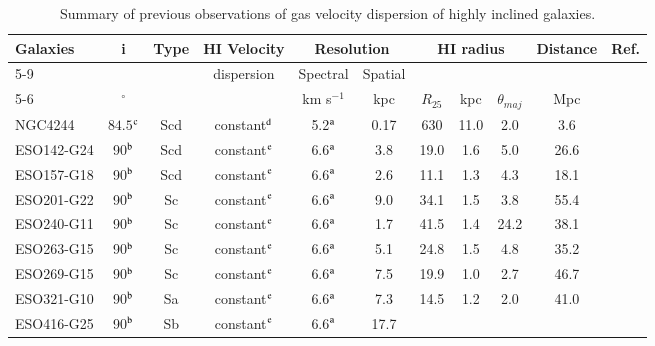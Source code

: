 \documentclass[traditabstract]{aa} %
\newcommand\kms{km s$^{-1}$}
\newcommand\dg{$^{\circ }$}
\begin{document}
\begin{table}[t] %
\caption[Summary of previous measurements of gas velocity 
dispersion in highly-inclined 
galaxies]{Summary of 
  previous observations of gas velocity dispersion of highly inclined galaxies.}
\label{tab:ch4-vel-disp-meas-highi}
\begin{footnotesize}
\begin{tabular}{lcccccccccc}
\hline
Galaxies & i & Type & H{\scriptsize I} Velocity & 
\multicolumn{2}{c}{Resolution} &
\multicolumn{3}{c}{H{\scriptsize I} radius} & Distance & Ref. \\
\cline{5-9}
& & & dispersion & Spectral &
Spatial &  &  & & & \\
\cline{5-6}
& \dg & & & \kms & kpc & $R_{25}$ & kpc & $\theta_{maj}$ & Mpc &  \\
\hline\hline
NGC4244 & $84.5$$^{\rm c}$ & Scd & constant$^{\rm d}$ &
5.2$^{\rm a}$ & 0.17 & 630 & 11.0 & 2.0 & 3.6 &
\citet{olling1996a} \\
ESO142-G24  & 90$^{\rm b}$    & Scd    &
constant$^{\rm e}$ & 6.6$^{\rm a}$   & 3.8
& 19.0    & 1.6      & 5.0    & 26.6 &
\citet{kvdkdb2004} \\
ESO157-G18  & 90$^{\rm b}$    & Scd    &
constant$^{\rm e}$ & 6.6$^{\rm a}$    & 2.6     &
11.1    & 1.3      & 4.3    & 18.1 &
\citet{kvdkdb2004} \\
ESO201-G22  & 90$^{\rm b}$    & Sc    &
constant$^{\rm e}$ & 6.6$^{\rm a}$     & 9.0     &
34.1    & 1.5      & 3.8    & 55.4 &
\citet{kvdkdb2004} \\
ESO240-G11  & 90$^{\rm b}$    & Sc   &
constant$^{\rm e}$ & 6.6$^{\rm a}$     & 1.7     &
41.5    & 1.4     & 24.2    & 38.1 &
\citet{kvdkdb2004} \\
ESO263-G15  & 90$^{\rm b}$    & Sc    &
constant$^{\rm e}$ & 6.6$^{\rm a}$     & 5.1     &
24.8    & 1.5      & 4.8    & 35.2 &
\citet{kvdkdb2004} \\
ESO269-G15  & 90$^{\rm b}$    & Sc    &
constant$^{\rm e}$ & 6.6$^{\rm a}$     & 7.5     &
19.9    & 1.0      & 2.7    & 46.7 &
\citet{kvdkdb2004} \\
ESO321-G10  & 90$^{\rm b}$    & Sa    &
constant$^{\rm e}$ & 6.6$^{\rm a}$     & 7.3       &
14.5    & 1.2      & 2.0    & 41.0 &
\citet{kvdkdb2004} \\
ESO416-G25  & 90$^{\rm b}$    & Sb    &
constant$^{\rm e}$ & 6.6$^{\rm a}$     & 17.7     &
$$
\end{tabular}
\end{footnotesize}
\end{table}
\end{document}
